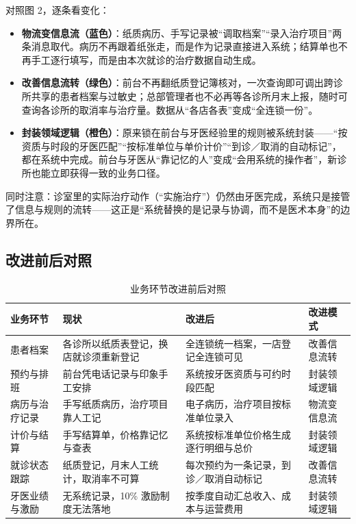 \documentclass[11pt,a4paper]{ctexart}
\newcommand{\figtag}[1]{%
  \tikz[baseline=-0.35ex]{\node[fill=adcblue!90,text=white,rounded corners=1.5pt,
    inner xsep=5pt,inner ysep=1.2pt,font=\scriptsize\bfseries]{#1};}\hspace{2pt}}
\begin{document}
\figtag{图 3 说明} 对照图 2，逐条看变化：

\begin{itemize}[leftmargin=1.6em,topsep=3pt,itemsep=3pt]
  \item \textbf{物流变信息流（蓝色）}：纸质病历、手写记录被“调取档案”“录入治疗项目”两条消息取代。病历不再跟着纸张走，而是作为记录直接进入系统；结算单也不再手工逐行填写，而是由本次就诊的治疗数据自动生成。
  \item \textbf{改善信息流转（绿色）}：前台不再翻纸质登记簿核对，一次查询即可调出跨诊所共享的患者档案与过敏史；总部管理者也不必再等各诊所月末上报，随时可查询各诊所的取消率与治疗量。数据从“各店各表”变成“全连锁一份”。
  \item \textbf{封装领域逻辑（橙色）}：原来锁在前台与牙医经验里的规则被系统封装——“按资质与时段的牙医匹配”“按标准单位与单价计价”“到诊／取消的自动标记”，都在系统中完成。前台与牙医从“靠记忆的人”变成“会用系统的操作者”，新诊所也能立即获得一致的业务口径。
\end{itemize}

同时注意：诊室里的实际治疗动作（“实施治疗”）仍然由牙医完成，系统只是接管了信息与规则的流转——这正是“系统替换的是记录与协调，而不是医术本身”的边界所在。

\subsection{改进前后对照}

\begin{table}[H]
\centering
\caption{业务环节改进前后对照}
\begin{tabularx}{\linewidth}{@{}L{2.5cm}L{4.6cm}L{4.6cm}L{2.0cm}@{}}
\toprule
\textbf{\textcolor{adcblue!92}{业务环节}} & \textbf{\textcolor{adcblue!92}{现状}} & \textbf{\textcolor{adcblue!92}{改进后}} & \textbf{\textcolor{adcblue!92}{改进模式}} \\
\midrule
患者档案 & 各诊所以纸质表登记，换店就诊须重新登记 & 全连锁统一档案，一店登记全连锁可见 & 改善信息流转 \\
\addlinespace
预约与排班 & 前台凭电话记录与印象手工安排 & 系统按牙医资质与可约时段匹配 & 封装领域逻辑 \\
\addlinespace
病历与治疗记录 & 手写纸质病历，治疗项目靠人工记 & 电子病历，治疗项目按标准单位录入 & 物流变信息流 \\
\addlinespace
计价与结算 & 手写结算单，价格靠记忆与查表 & 系统按标准单位价格生成逐行明细与总价 & 封装领域逻辑 \\
\addlinespace
就诊状态跟踪 & 纸质登记，月末人工统计，取消率不可算 & 每次预约为一条记录，到诊／取消自动标记 & 改善信息流转 \\
\addlinespace
牙医业绩与激励 & 无系统记录，10\% 激励制度无法落地 & 按季度自动汇总收入、成本与运营费用 & 封装领域逻辑 \\
\bottomrule
\end{tabularx}
\end{table}
\end{document}
